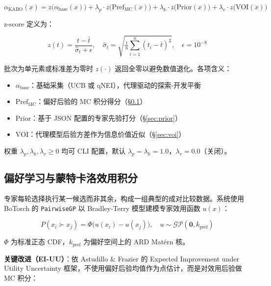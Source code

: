 \documentclass[12pt,a4paper]{article}
\begin{document}
\begin{equation}
    \alpha_{\text{KABO}}(x) = z\bigl(\alpha_{\text{base}}(x)\bigr)
    + \lambda_p \cdot z\bigl(\text{Pref}_{\text{MC}}(x)\bigr)
    + \lambda_k \cdot z\bigl(\text{Prior}(x)\bigr)
    + \lambda_v \cdot z\bigl(\text{VOI}(x)\bigr)
    \label{eq:kabo}
\end{equation}

z-score 定义为：

\begin{equation}
    z(t) = \frac{t - \bar{t}}{\hat{\sigma}_t + \epsilon}, \quad \hat{\sigma}_t = \sqrt{\tfrac{1}{n} \sum_{i=1}^n (t_i - \bar{t})^2}, \quad \epsilon = 10^{-8}
\end{equation}

批次为单元素或标准差为零时 $z(\cdot)$ 返回全零以避免数值退化。各项含义：

\begin{itemize}
    \item $\alpha_{\text{base}}$：基础采集（UCB 或 qNEI），代理驱动的探索-开发平衡
    \item $\text{Pref}_{\text{MC}}$：偏好后验的 MC 积分得分（\S\ref{sec:pref}）
    \item $\text{Prior}$：基于 JSON 配置的专家先验打分（\S\ref{sec:prior}）
    \item $\text{VOI}$：代理模型后验方差作为信息价值近似（\S\ref{sec:voi}）
\end{itemize}

权重 $\lambda_p, \lambda_k, \lambda_v \geq 0$ 均可 CLI 配置，默认 $\lambda_p = \lambda_k = 1.0$，$\lambda_v = 0.0$（关闭）。

\subsection{偏好学习与蒙特卡洛效用积分}
\label{sec:pref}

专家每轮选择执行某一候选而非其余，构成一组典型的成对比较数据。系统使用 BoTorch 的 \texttt{PairwiseGP}\cite{botorch2019} 以 Bradley-Terry 模型建模专家效用函数 $u(x)$：

\begin{equation}
    P(x_i \succ x_j) = \Phi\bigl(u(x_i) - u(x_j)\bigr), \quad u \sim \mathcal{GP}(\mathbf{0}, k_{\text{pref}})
\end{equation}

$\Phi$ 为标准正态 CDF，$k_{\text{pref}}$ 为偏好空间上的 ARD Mat\'{e}rn 核。

\textbf{关键改进（EI-UU）}：依 Astudillo \& Frazier\cite{astudillo2019} 的 Expected Improvement under Utility Uncertainty 框架，不使用偏好后验均值作为点估计，而是对效用后验做 MC 积分：
\end{document}
